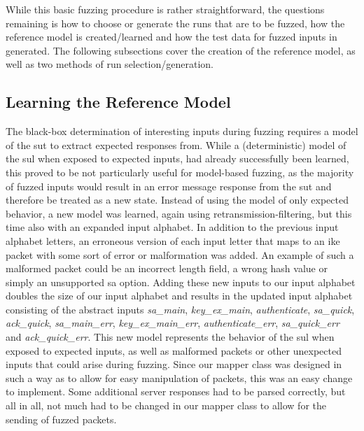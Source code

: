 While this basic fuzzing procedure is rather straightforward, the questions remaining is how to choose or generate the runs that are to be fuzzed, how the reference model is created/learned and how the test data for fuzzed inputs in generated. The following subsections cover the creation of the reference model, as well as two methods of run selection/generation.

\subsection{Learning the Reference Model} \label{subsec:adapting_model}
The black-box determination of interesting inputs during fuzzing requires a model of the \ac{sut} to extract expected responses from. While a (deterministic) model of the \ac{sul} when exposed to expected inputs, had already successfully been learned, this proved to be not particularly useful for model-based fuzzing, as the majority of fuzzed inputs would result in an error message response from the \ac{sut} and therefore be treated as a new state. Instead of using the model of only expected behavior, a new model was learned, again using retransmission-filtering, but this time also with an expanded input alphabet. In addition to the previous input alphabet letters, an erroneous version of each input letter that maps to an \ac{ike} packet with some sort of error or malformation was added. An example of such a malformed packet could be an incorrect length field, a wrong hash value or simply an unsupported \ac{sa} option. Adding these new inputs to our input alphabet doubles the size of our input alphabet and results in the updated input alphabet consisting of the abstract inputs \emph{sa\_main}, \emph{key\_ex\_main}, \emph{authenticate}, \emph{sa\_quick}, \emph{ack\_quick}, \emph{sa\_main\_err}, \emph{key\_ex\_main\_err}, \emph{authenticate\_err}, \emph{sa\_quick\_err} and \emph{ack\_quick\_err}. This new model represents the behavior of the \ac{sul} when exposed to expected inputs, as well as malformed packets or other unexpected inputs that could arise during fuzzing. Since our mapper class was designed in such a way as to allow for easy manipulation of packets, this was an easy change to implement. Some additional server responses had to be parsed correctly, but all in all, not much had to be changed in our mapper class to allow for the sending of fuzzed packets. 


